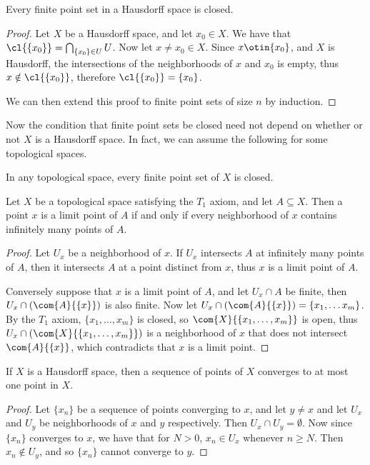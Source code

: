 \begin{theorem}\label{1.6.8}
    Every finite point set in a Hausdorff space is closed.
\end{theorem}
\begin{proof}
    Let $X$ be a Hausdorff space, and let  $x_0 \in X$. We have that
    $\cl{\{x_0\}}=\bigcap_{\{x_0\} \in U}{U}$. Now let $x \neq x_0 \in X$.
    Since $x \otin \{x_0\}$, and $X$ is Hausdorff, the intersections of the
    neighborhoods of $x$ and  $ x_0$ is empty, thus $x \notin \cl{\{x_0\}}$,
    therefore $\cl{\{x_0\}}=\{x_0\}$.

    We can then extend this proof to finite point sets of size $n$ by induction.
\end{proof}

Now the condition that finite point sets be closed need not depend on whether or
not $X$ is a Hausdorff space. In fact, we can assume the following for some
topological spaces.

\begin{axiom}\label{axm1.6.1}
    In any topological space, every finite point set of $X$ is closed.
\end{axiom}

\begin{theorem}\label{1.6.9}
    Let $X$ be a topological space satisfying the $ T_1$ axiom, and let $A
    \subseteq X$. Then a point  $x$ is a limit point of  $A$ if and only if
    every neighborhood of  $x$ contains infinitely many points of  $A$.
\end{theorem}
\begin{proof}
    Let $U_x$ be a neighborhood of  $x$. If  $U_x$ intersects $A$ at infinitely
    many points of  $A$, then it intersects  $A$ at a point distinct from  $x$,
    thus  $x$ is a limit point of  $A$.

    Conversely suppose that  $x$ is a limit point of  $A$, and let  $U_x \cap A$
    be finite, then  $U_x \cap (\com{A}{\{x\}})$ is also  finite. Now let
    $U_x \cap (\com{A}{\{x\}})=\{x_1, \dots x_m\}$. By the $T_1$ axiom,
    $\{x_1, \dots, x_m\}$ is closed, so $\com{X}{\{x_1, \dots, x_m\}}$ is open,
    thus $U_x \cap (\com{X}{\{x_1, \dots, x_m\}})$ is a neighborhood of $x$ that
    does not intersect  $\com{A}{\{x\}}$, which contradicts that  $x$ is a
    limit point.
\end{proof}

\begin{theorem}\label{1.6.10}
    If $X$ is a Hausdorff space, then a sequence of points of  $X$ converges to
    at most one point in  $X$.
\end{theorem}
\begin{proof}
    Let $\{x_n\}$ be a sequence of points converging to $x$, and let  $y \neq x$
    and let  $U_x$ and  $U_y$ be neighborhoods of  $x$ and  $y$ respectively.
    Then $U_x \cap U_y = \emptyset$. Now since  $\{x_n\}$ converges to  $x$, we
    have that for $N>0$, $x_n \in U_x$ whenever $n \geq N$. Then $x_n \notin
    U_y$, and so  $\{x_n\}$ cannot converge to  $y$.
\end{proof}

